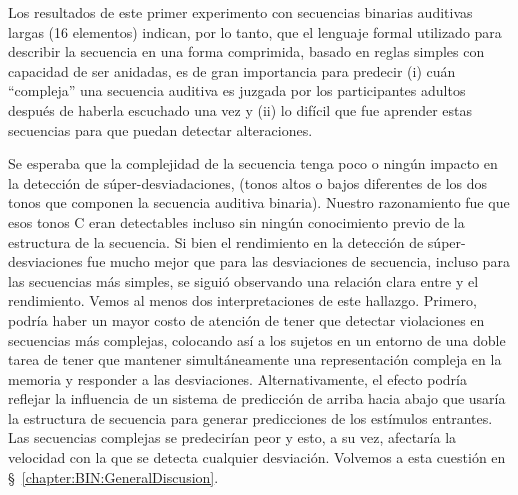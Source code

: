 Los resultados de este primer experimento con secuencias binarias auditivas largas (16 elementos) indican, por lo tanto, que el lenguaje formal utilizado para describir la secuencia en una forma comprimida, basado en reglas simples con capacidad de ser anidadas, es de gran importancia para predecir (i) cuán ``compleja'' una secuencia auditiva es juzgada por los participantes adultos después de haberla escuchado una vez y (ii) lo difícil que fue aprender estas secuencias para que puedan detectar alteraciones.


Se esperaba que la complejidad de la secuencia tenga poco o ningún impacto en la detección de súper-desviadaciones, (tonos altos o bajos diferentes de los dos tonos que componen la secuencia auditiva binaria). Nuestro razonamiento fue que esos tonos C eran detectables incluso sin ningún conocimiento previo de la estructura de la secuencia. Si bien el rendimiento en la detección de súper-desviaciones fue mucho mejor que para las desviaciones de secuencia, incluso para las secuencias más simples, se siguió observando una relación clara entre \mdlbin y el rendimiento. Vemos al menos dos interpretaciones de este hallazgo. Primero, podría haber un mayor costo de atención de tener que detectar violaciones en secuencias más complejas, colocando así a los sujetos en un entorno de una doble tarea de tener que mantener simultáneamente una representación compleja en la memoria y responder a las desviaciones. Alternativamente, el efecto podría reflejar la influencia de un sistema de predicción de arriba hacia abajo que usaría la estructura de secuencia para generar predicciones de los estímulos entrantes. Las secuencias complejas se predecirían peor y esto, a su vez, afectaría la velocidad con la que se detecta cualquier desviación. Volvemos a esta cuestión en \S~\ref{chapter:BIN:GeneralDiscusion}.

